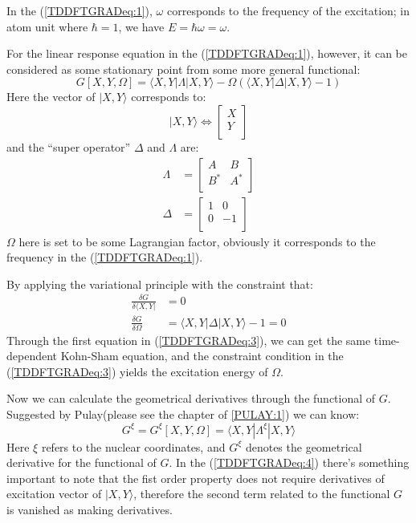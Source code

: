 In the (\ref{TDDFTGRADeq:1}), $\omega$ corresponds to the frequency
of the excitation; in atom unit where $\hbar = 1$, we have $E =
\hbar\omega = \omega$.

For the linear response equation in the (\ref{TDDFTGRADeq:1}),
however, it can be considered as some stationary point from some
more general functional:
\begin{equation}\label{TDDFTGRADeq:2}
G[X,Y,\Omega] =\langle X,Y|\Lambda|X,Y\rangle - \Omega(\langle
X,Y|\Delta|X,Y\rangle - 1)
\end{equation}
Here the vector of $|X,Y\rangle$ corresponds to:
\begin{equation}\label{}
|X,Y\rangle \Leftrightarrow
\begin{bmatrix}
  X \\
  Y \\
\end{bmatrix}
\end{equation}
and the ``super operator'' $\Delta$ and $\Lambda$ are:
\begin{align}\label{}
\Lambda &=
\begin{bmatrix}
  A & B \\
  B^{*} & A^{*} \\
\end{bmatrix} \nonumber \\
\Delta &=
\begin{bmatrix}
  1 &  0 \\
  0 & -1 \\
\end{bmatrix}
\end{align}
$\Omega$ here is set to be some Lagrangian factor, obviously it
corresponds to the frequency in the (\ref{TDDFTGRADeq:1}).

By applying the variational principle with the constraint that:
\begin{align}\label{TDDFTGRADeq:3}
\frac{\delta G}{\delta \langle X,Y|} &= 0 \\
\frac{\delta G}{\delta \Omega} &= \langle X,Y|\Delta|X,Y\rangle - 1
 = 0
\end{align}
Through the first equation in (\ref{TDDFTGRADeq:3}), we can get the
same time-dependent Kohn-Sham equation, and the constraint condition
in the (\ref{TDDFTGRADeq:3}) yields the excitation energy of
$\Omega$.

Now we can calculate the geometrical derivatives through the
functional of $G$. Suggested by Pulay(please see the chapter of
\ref{PULAY:1}) we can know:
\begin{equation}\label{TDDFTGRADeq:4}
G^{\xi} = G^{\xi}[X,Y,\Omega] = \langle X,Y|\Lambda^{\xi}|X,Y\rangle
\end{equation}
Here $\xi$ refers to the nuclear coordinates, and $G^{\xi}$ denotes
the geometrical derivative for the functional of $G$. In the
(\ref{TDDFTGRADeq:4}) there's something important to note that the
fist order property does not require derivatives of excitation
vector of $|X,Y\rangle$, therefore the second term related to the
functional $G$ is vanished as making derivatives.

